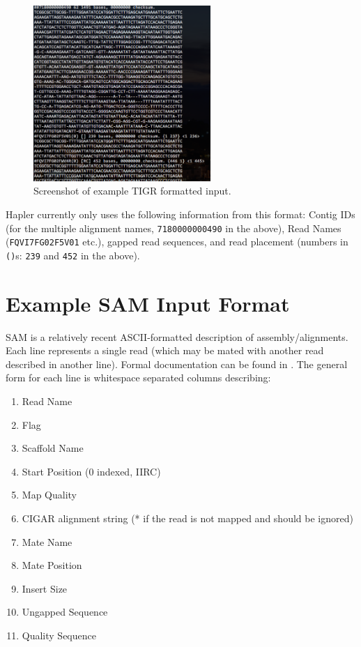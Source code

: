 \documentclass[11pt]{llncs}
\begin{document}
\begin{figure}[!h]
\centering
   \includegraphics[width=0.6\textwidth]{graphics/Example_tigr}
   \caption{Screenshot of example TIGR formatted input.}
   \label{exampleTIGR}
\end{figure}

Hapler currently only uses the following information from this format:  Contig IDs (for the multiple alignment names, \texttt{7180000000490} in the above),
Read Names (\texttt{FQVI7FG02F5V01} etc.), gapped read sequences, and read placement (numbers in \texttt{()}s: \texttt{239} and \texttt{452} in the above).

\newpage
\section{Example SAM Input Format}
\label{exampleSamInputFormat}

SAM is a relatively recent ASCII-formatted description of assembly/alignments. Each line represents a single read (which may be mated with another
read described in another line). Formal documentation can be found in \cite{LI2009}. The general form for each line is whitespace separated columns 
describing:

\begin{enumerate}
	\item Read Name
	\item Flag
	\item Scaffold Name
	\item Start Position (0 indexed, IIRC)
	\item Map Quality
	\item CIGAR alignment string (* if the read is not mapped and should be ignored)
	\item Mate Name
	\item Mate Position
	\item Insert Size
	\item Ungapped Sequence
	\item Quality Sequence
\end{enumerate}
\end{document}
